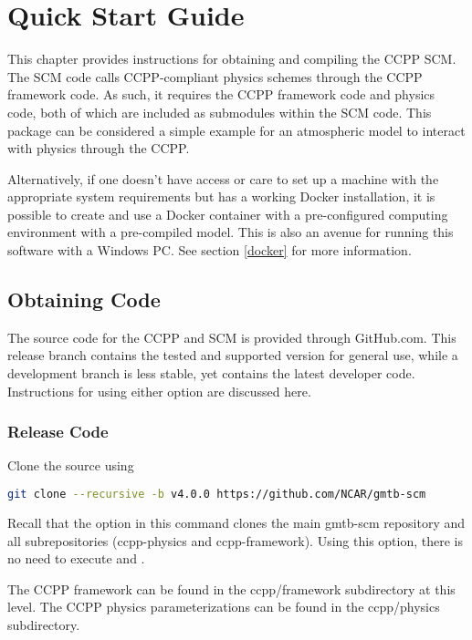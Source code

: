 \chapter{Quick Start Guide}
\label{chapter: quick}

This chapter provides instructions for obtaining and compiling the CCPP SCM. The SCM code calls CCPP-compliant physics schemes through the CCPP framework code. As such, it requires the CCPP framework code and physics code, both of which are included as submodules within the SCM code. This package can be considered a simple example for an atmospheric model to interact with physics through the CCPP.

Alternatively, if one doesn't have access or care to set up a machine with the appropriate system requirements but has a working Docker installation, it is possible to create and use a Docker container with a pre-configured computing environment with a pre-compiled model. This is also an avenue for running this software with a Windows PC. See section \ref{docker} for more information.

\section{Obtaining Code}
\label{obtaining_code}

The source code for the CCPP and SCM is provided through GitHub.com.  This release branch contains the tested and supported version for general use, while a development branch is less stable, yet contains the latest developer code. Instructions for using either option are discussed here.

\subsection{Release Code}

Clone the source using
\begin{lstlisting}[language=bash]
git clone --recursive -b v4.0.0 https://github.com/NCAR/gmtb-scm
\end{lstlisting}
             Recall that the  option in this command clones the main gmtb-scm repository and all subrepositories (ccpp-physics and ccpp-framework). Using this option, there is no need to execute  and .

The CCPP framework can be found in the ccpp/framework subdirectory at this level.  The CCPP physics parameterizations can be found in the ccpp/physics subdirectory.

